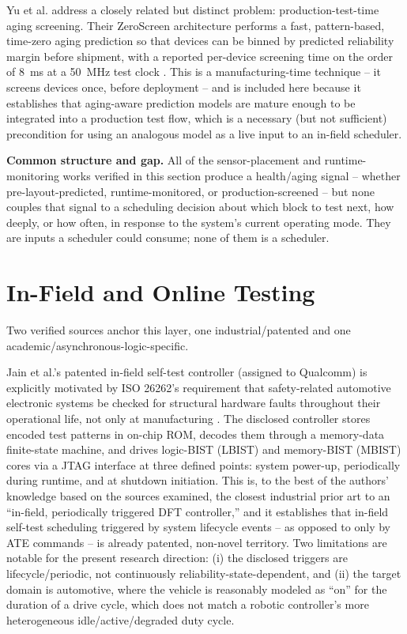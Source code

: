 \documentclass[journal]{IEEEtran}
\begin{document}
Yu et al. address a closely related but distinct problem: production-test-time aging screening. Their ZeroScreen architecture performs a fast, pattern-based, time-zero aging prediction so that devices can be binned by predicted reliability margin before shipment, with a reported per-device screening time on the order of 8~ms at a 50~MHz test clock \cite{r7}. This is a manufacturing-time technique -- it screens devices once, before deployment -- and is included here because it establishes that aging-aware prediction models are mature enough to be integrated into a production test flow, which is a necessary (but not sufficient) precondition for using an analogous model as a live input to an in-field scheduler.

\textbf{Common structure and gap.} All of the sensor-placement and runtime-monitoring works verified in this section \cite{r4,r5,r13,r14,r6,r15,r7} produce a health/aging signal -- whether pre-layout-predicted, runtime-monitored, or production-screened -- but none couples that signal to a scheduling decision about which block to test next, how deeply, or how often, in response to the system's current operating mode. They are inputs a scheduler could consume; none of them is a scheduler.

\section{In-Field and Online Testing}
Two verified sources anchor this layer, one industrial/patented and one academic/asynchronous-logic-specific.

Jain et al.'s patented in-field self-test controller (assigned to Qualcomm) is explicitly motivated by ISO 26262's requirement that safety-related automotive electronic systems be checked for structural hardware faults throughout their operational life, not only at manufacturing \cite{r9,r10}. The disclosed controller stores encoded test patterns in on-chip ROM, decodes them through a memory-data finite-state machine, and drives logic-BIST (LBIST) and memory-BIST (MBIST) cores via a JTAG interface at three defined points: system power-up, periodically during runtime, and at shutdown initiation. This is, to the best of the authors' knowledge based on the sources examined, the closest industrial prior art to an ``in-field, periodically triggered DFT controller,'' and it establishes that in-field self-test scheduling triggered by system lifecycle events -- as opposed to only by ATE commands -- is already patented, non-novel territory. Two limitations are notable for the present research direction: (i) the disclosed triggers are lifecycle/periodic, not continuously reliability-state-dependent, and (ii) the target domain is automotive, where the vehicle is reasonably modeled as ``on'' for the duration of a drive cycle, which does not match a robotic controller's more heterogeneous idle/active/degraded duty cycle.
\end{document}
